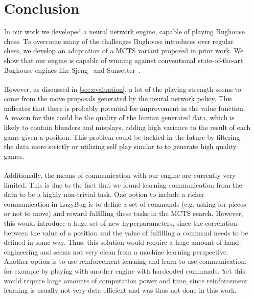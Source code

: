 \section{Conclusion}

In our work we developed a neural network engine, capable of playing Bughouse chess.
To overcome many of the challenges Bughouse introduces over regular chess, we develop an adaptation of a MCTS variant proposed in prior work\cite{alphago, alphazero}.
We show that our engine is capable of winning against conventional state-of-the-art Bughouse engines like Sjeng~\cite{sjeng} and Sunsetter~\cite{sunsetter}.
\\\\
However, as discussed in \autoref{sec:evaluation}, a lot of the playing strength seems to come from the move proposals generated by the neural network policy.
This indicates that there is probably potential for improvement in the value function.
A reason for this could be the quality of the human generated data, which is likely to contain blunders and misplays, adding high variance to the result of each game given a position.
This problem could be tackled in the future by filtering the data more strictly or utilizing self play similar to \citet{alphago} to generate high quality games.
\\\\
Additionally, the means of communication with our engine are currently very limited.
This is due to the fact that we found learning communication from the data to be a highly non-trivial task.
One option to include a richer communication in LazyBug is to define a set of commands (e.g. asking for pieces or not to move) and reward fulfilling these tasks in the MCTS search.
However, this would introduce a huge set of new hyperparameters, since the correlation between the value of a position and the value of fulfilling a command needs to be defined in some way.
Thus, this solution would require a huge amount of hand-engineering and seems not very clean from a machine learning perspective.
Another option is to use reinforcement learning and learn to use communication, for example by playing with another engine with hardcoded commands.
Yet this would require large amounts of computation power and time, since reinforcement learning is usually not very data efficient and was thus not done in this work.
